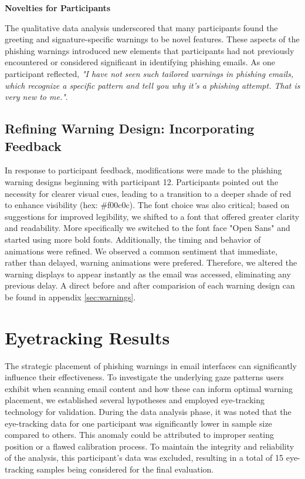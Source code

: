 \documentclass[
  a4paper,  %
  twoside,  %
  bibliography=totoc,
  headsepline,
  cleardoublepage=empty,
  parskip=half,
  draft=false
]{scrbook}
\begin{document}
\textbf{Novelties for Participants}

The qualitative data analysis underscored that many participants found the greeting and signature-specific warnings to be novel features. These aspects of the phishing warnings introduced new elements that participants had not previously encountered or considered significant in identifying phishing emails. As one participant reflected, \textit{"I have not seen such tailored warnings in phishing emails, which recognize a specific pattern and tell you why it's a phishing attempt. That is very new to me."}.

\subsection{Refining Warning Design: Incorporating Feedback}
In response to participant feedback, modifications were made to the phishing warning designs beginning with participant 12. Participants pointed out the necessity for clearer visual cues, leading to a transition to a deeper shade of red to enhance visibility (hex: \#f00c0c). The font choice was also critical; based on suggestions for improved legibility, we shifted to a font that offered greater clarity and readability. More specifically we switched to the font face "Open Sans" and started using more bold fonts. Additionally, the timing and behavior of animations were refined. We observed a common sentiment that immediate, rather than delayed, warning animations were prefered. Therefore, we altered the warning displays to appear instantly as the email was accessed, eliminating any previous delay. A direct before and after comparision of each warning design can be found in appendix \ref{sec:warnings}.

\section{Eyetracking Results}
\label{sec:eyetrackingres}
The strategic placement of phishing warnings in email interfaces can significantly influence their effectiveness. To investigate the underlying gaze patterns users exhibit when scanning email content and how these can inform optimal warning placement, we established several hypotheses and employed eye-tracking technology for validation. \newline
During the data analysis phase, it was noted that the eye-tracking data for one participant was significantly lower in sample size compared to others. This anomaly could be attributed to improper seating position or a flawed calibration process. To maintain the integrity and reliability of the analysis, this participant's data was excluded, resulting in a total of 15 eye-tracking samples being considered for the final evaluation.
\end{document}
